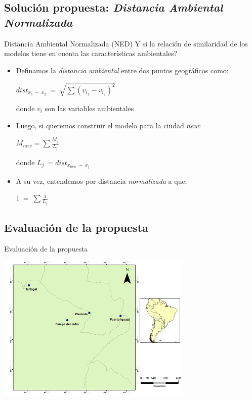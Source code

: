 \documentclass[10pt]{beamer}
\begin{document}
\subsection{Solución propuesta: \textit{Distancia Ambiental Normalizada}}


\begin{frame}{Distancia Ambiental Normalizada (NED)}
  Y si la relación de similaridad de los modelos tiene en cuenta las características
  ambientales?
  \pause
  \begin{itemize}[<+->]
    \item Definamos la \textit{distancia ambiental} entre dos puntos geográficos como:
      \begin{center}
        $dist_{x_{1}\ -\ x_{2}} \ =\ \sqrt{\sum{}{(v_{i_{1}} - v_{i_{2}})^{2}}}$
      \end{center}
      donde $v_{i}$ son las variables ambientales

    \item Luego, si queremos construir el modelo para la ciudad $new$:
      \begin{center}
        $M_{new} = \sum{}{\frac{M_{j}}{L_{j}}}$
      \end{center}
      donde $L_{j}\ = dist_{x_{new}\ -\ x_{j}}$
    \item A su vez, entendemos por distancia \textit{normalizada} a que:
    \begin{center}
      $1\ =\ \sum{}{\frac{1}{L_{j}}}$
    \end{center}

  \end{itemize}
\end{frame}

\subsection{Evaluación de la propuesta}


\begin{frame}{Evaluación de la propuesta}
  \begin{center}
    \includegraphics[width=0.7\textwidth]{zonas_ned1}
  \end{center}
\end{frame}
\end{document}
